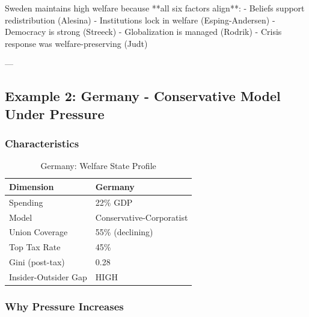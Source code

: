 Sweden maintains high welfare because **all six factors align**:
- Beliefs support redistribution (Alesina)
- Institutions lock in welfare (Esping-Andersen)
- Democracy is strong (Streeck)
- Globalization is managed (Rodrik)
- Crisis response was welfare-preserving (Judt)

---

\subsection{Example 2: Germany - Conservative Model Under Pressure}

\subsubsection{Characteristics}

\begin{table}[h]
\centering
\caption{Germany: Welfare State Profile}
\label{tab:germany-profile}
\begin{tabular}{ll}
\toprule
\textbf{Dimension} & \textbf{Germany} \\
\midrule
Spending & 22\% GDP \\
Model & Conservative-Corporatist \\
Union Coverage & 55\% (declining) \\
Top Tax Rate & 45\% \\
Gini (post-tax) & 0.28 \\
Insider-Outsider Gap & HIGH \\
\bottomrule
\end{tabular}
\end{table}

\subsubsection{Why Pressure Increases}

